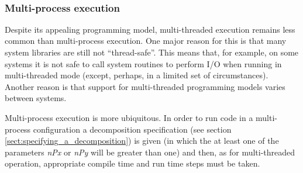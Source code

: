  \\

\subsubsection{Multi-process execution}
\label{sect:multi-process-execution}

Despite its appealing programming model, multi-threaded execution
remains less common than multi-process execution. One major reason for
this is that many system libraries are still not ``thread-safe''. This
means that, for example, on some systems it is not safe to call system
routines to perform I/O when running in multi-threaded mode (except,
perhaps, in a limited set of circumstances).  Another reason is that
support for multi-threaded programming models varies between systems.

Multi-process execution is more ubiquitous.  In order to run code in a
multi-process configuration a decomposition specification (see section
\ref{sect:specifying_a_decomposition}) is given (in which the at least
one of the parameters {\em nPx} or {\em nPy} will be greater than one)
and then, as for multi-threaded operation, appropriate compile time
and run time steps must be taken.

